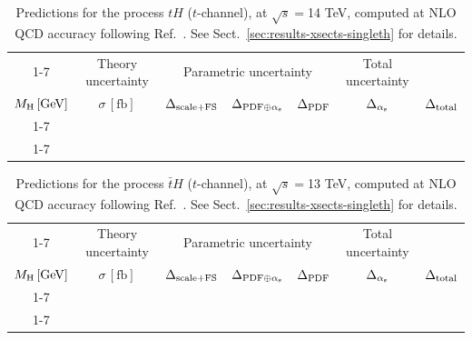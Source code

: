 \begin{table}[ht!]
\caption{\label{tab:th-t-top14} Predictions for the process $tH$ ($t$-channel), at $\sqrt{s}=$14 TeV, computed at NLO QCD accuracy following Ref.~\cite{Demartin:2015uha}. See Sect.~\ref{sec:results-xsects-singleth} for details.}
\centering
\scriptsize
{\renewcommand{\arraystretch}{1.4}
\begin{tabular}{| cc | c | ccc | c |}
\cline{1-7}
\multicolumn{2}{|c|}{\(\sqrt{s} = 14\,\mathrm{TeV}\)} &
\multicolumn{1}{|c|}{Theory uncertainty} &
\multicolumn{3}{|c|}{Parametric uncertainty} &
\multicolumn{1}{c|}{Total uncertainty} \\
\(M_\mathrm{H}\,[\mathrm{GeV}]\) & \(\sigma\,[\mathrm{fb}]\) &
\(\Delta_{\rm scale+\textrm{FS}}\) &
\(\Delta_{{\rm PDF}\oplus\alpha_{\mathrm{s}}}\) &
{\color{black!55}\(\Delta_{\rm PDF}\)} & {\color{black!55}\(\Delta_{\alpha_{\mathrm{s}}}\)} &
\(\Delta_{\rm total}\)
\\
\cline{1-7}
 \\
\cline{1-7}
\end{tabular}
}
\end{table}
%
\begin{table}[ht!]
\caption{\label{tab:th-t-atop13} Predictions for the process $\bar tH$ ($t$-channel), at $\sqrt{s}=$13 TeV, computed at NLO QCD accuracy following Ref.~\cite{Demartin:2015uha}. See Sect.~\ref{sec:results-xsects-singleth} for details.}
\centering
\scriptsize
{\renewcommand{\arraystretch}{1.4}
\begin{tabular}{| cc | c | ccc | c |}
\cline{1-7}
\multicolumn{2}{|c|}{\(\sqrt{s} = 13\,\mathrm{TeV}\)} &
\multicolumn{1}{|c|}{Theory uncertainty} &
\multicolumn{3}{|c|}{Parametric uncertainty} &
\multicolumn{1}{c|}{Total uncertainty} \\
\(M_\mathrm{H}\,[\mathrm{GeV}]\) & \(\sigma\,[\mathrm{fb}]\) &
\(\Delta_{\rm scale+\textrm{FS}}\) &
\(\Delta_{{\rm PDF}\oplus\alpha_{\mathrm{s}}}\) &
{\color{black!55}\(\Delta_{\rm PDF}\)} & {\color{black!55}\(\Delta_{\alpha_{\mathrm{s}}}\)} &
\(\Delta_{\rm total}\)
\\
\cline{1-7}
 \\
\cline{1-7}
\end{tabular}
}
\end{table}

